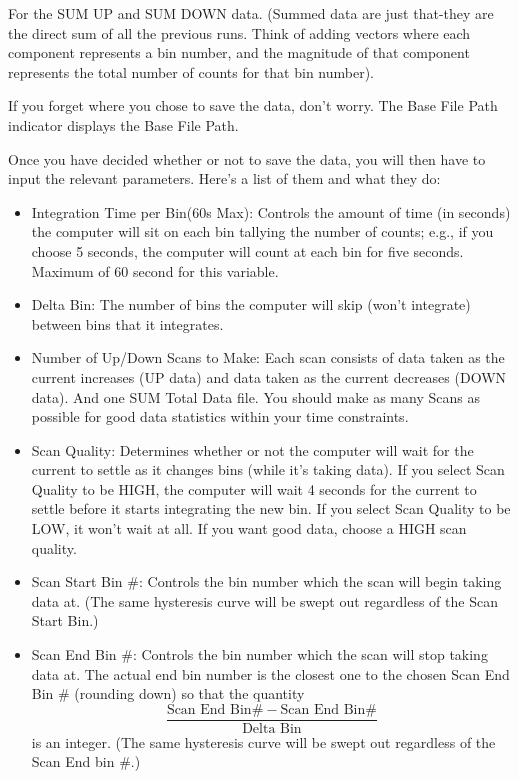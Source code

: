 \documentclass{../lab}
\begin{document}
For the SUM UP and SUM DOWN data. (Summed data are just that-they are the direct sum of all the previous runs. Think of adding vectors where each component represents a bin number, and the magnitude of that component represents the total number of counts for that bin number).

If you forget where you chose to save the data, don't worry. The Base File Path indicator displays the Base File Path.

Once you have decided whether or not to save the data, you will then have to input the relevant parameters. Here's a list of them and what they do:
\begin{itemize}
    \item Integration Time per Bin(60s Max): Controls the amount of time (in seconds) the computer will sit on each bin tallying the number of counts; e.g., if you choose 5 seconds, the computer will count at each bin for five seconds. Maximum of 60 second for this variable.

    \item Delta Bin: The number of bins the computer will skip (won't integrate) between bins that it integrates.

    \item Number of Up/Down Scans to Make: Each scan consists of data taken as the current increases (UP data) and data taken as the current decreases (DOWN data). And one SUM Total Data file. You should make as many Scans as possible for good data statistics within your time constraints.

    \item Scan Quality: Determines whether or not the computer will wait for the current to settle as it changes bins (while it's taking data). If you select Scan Quality to be HIGH, the computer will wait 4 seconds for the current to settle before it starts integrating the new bin. If you select Scan Quality to be LOW, it won't wait at all. If you want good data, choose a HIGH scan quality.

    \item Scan Start Bin \#: Controls the bin number which the scan will begin taking data at. (The same hysteresis curve will be swept out regardless of the Scan Start Bin.)

    \item Scan End Bin \#: Controls the bin number which the scan will stop taking data at. The actual end bin number is the closest one to the chosen Scan End Bin \# (rounding down) so that the quantity
    \[
    \frac{\text{Scan End Bin} \# - \text{Scan End Bin} \#}{\text{Delta Bin}}
    \]
    is an integer. (The same hysteresis curve will be swept out regardless of the Scan End bin \#.)


\end{itemize}
\end{document}
